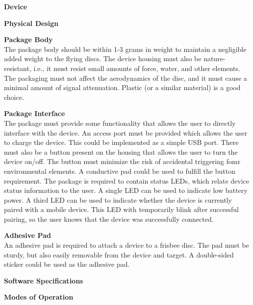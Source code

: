 \documentclass[12pt]{article}
\begin{document}
  \begin{packed_enum}
    \item \textbf{Device}
    \begin{packed_enum}
      \item \textbf{Physical Design}
      \begin{packed_enum}
        \item \textbf{Package Body} \\
        The package body should be within 1-3 grams in weight to maintain a negligible added weight to the 
        flying discs. The device housing must also be nature-resistant, i.e., it must resist small amounts of
        force, water, and other elements. The packaging must not affect the aerodynamics of the disc, and it
        must cause a minimal amount of signal attenuation. Plastic (or a similar material) is a good choice.
        \item \textbf{Package Interface} \\
        The package must provide some functionality that allows the user to directly interface with the device.
        An access port must be provided which allows the user to charge the device. This could be implemented 
        as a simple USB port. There must also be a button present on the housing that allows the user to turn
        the device on/off. The button must minimize the risk of accidental triggering fomr environmental
        elements. A conductive pad could be used to fulfill the button requirement. The package is required
        to contain status LEDs, which relate device status information to the user. A single LED can be used
        to indicate low battery power. A third LED can be used to indicate whether the device is currently
        paired with a mobile device. This LED with temporarily blink after successful pairing, so the user knows
        that the device was successfully connected.
        \item \textbf{Adhesive Pad} \\
        An adhesive pad is required to attach a device to a frisbee disc. The pad must be sturdy, but also
        easily removable from the device and target. A double-sided sticker could be used as the adhesive pad.
      \end{packed_enum}
      \item \textbf{Software Specifications}
      \begin{packed_enum}
        \item \textbf{Modes of Operation} \\

\end{packed_enum}
\end{packed_enum}
\end{packed_enum}
\end{document}
